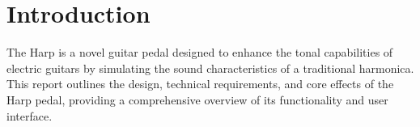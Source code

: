 \chapter{Introduction}

The Harp is a novel guitar pedal designed to enhance the tonal capabilities of electric guitars by simulating the sound characteristics of a traditional harmonica. This report outlines the design, technical requirements, and core effects of the Harp pedal, providing a comprehensive overview of its functionality and user interface.
